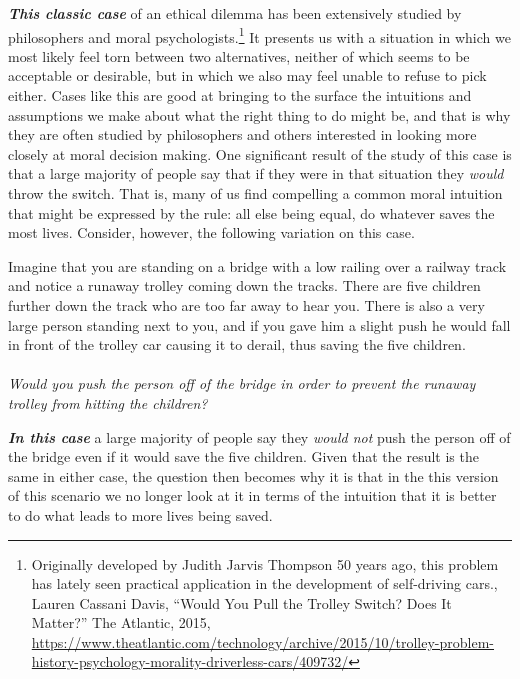 \documentclass[12pt, openany]{book}
\makeatletter
\newenvironment{kframe}{%
\medskip{}
\setlength{\fboxsep}{.8em}
 \def\at@end@of@kframe{}%
 \ifinner\ifhmode%
  \def\at@end@of@kframe{\end{minipage}}%
  \begin{minipage}{\columnwidth}%
 \fi\fi%
 \def\FrameCommand##1{\hskip\@totalleftmargin \hskip-\fboxsep
 \colorbox{shadecolor}{##1}\hskip-\fboxsep
     \hskip-\linewidth \hskip-\@totalleftmargin \hskip\columnwidth}%
 \MakeFramed {\advance\hsize-\width
   \@totalleftmargin\z@ \linewidth\hsize
   \@setminipage}}%
 {\par\unskip\endMakeFramed%
 \at@end@of@kframe}
\newenvironment{rmdblock}[1]
  {
  \begin{itemize}
  \renewcommand{\labelitemi}{
    \raisebox{-.7\height}[0pt][0pt]{
      {\setkeys{Gin}{width=3em,keepaspectratio}\texttt{[image: img/\#1]}}
    }
  }
  \setlength{\fboxsep}{1em}
  \begin{kframe}
  \item
  }
  {
  \end{kframe}
  \end{itemize}
  }
\newenvironment{question}
  {\begin{rmdblock}{question}}
  {\end{rmdblock}}
\makeatother
\begin{document}
\textbf{\emph{This classic case}} of an ethical dilemma has been extensively studied by philosophers and moral psychologists.\footnote{Originally developed by Judith Jarvis Thompson 50 years ago, this problem has lately seen practical application in the development of self-driving cars., Lauren Cassani Davis, ``Would You Pull the Trolley Switch? Does It Matter?'' The Atlantic, 2015, \url{https://www.theatlantic.com/technology/archive/2015/10/trolley-problem-history-psychology-morality-driverless-cars/409732/}} It presents us with a situation in which we most likely feel torn between two alternatives, neither of which seems to be acceptable or desirable, but in which we also may feel unable to refuse to pick either. Cases like this are good at bringing to the surface the intuitions and assumptions we make about what the right thing to do might be, and that is why they are often studied by philosophers and others interested in looking more closely at moral decision making. One significant result of the study of this case is that a large majority of people say that if they were in that situation they \emph{would} throw the switch. That is, many of us find compelling a common moral intuition that might be expressed by the rule: all else being equal, do whatever saves the most lives. Consider, however, the following variation on this case.

\begin{question}

Imagine that you are standing on a bridge with a low railing over a railway track and notice a runaway trolley coming down the tracks. There are five children further down the track who are too far away to hear you. There is also a very large person standing next to you, and if you gave him a slight push he would fall in front of the trolley car causing it to derail, thus saving the five children.\\
~\\
\emph{Would you push the person off of the bridge in order to prevent the runaway trolley from hitting the children?}

\end{question}

\textbf{\emph{In this case}} a large majority of people say they \emph{would not} push the person off of the bridge even if it would save the five children. Given that the result is the same in either case, the question then becomes why it is that in the this version of this scenario we no longer look at it in terms of the intuition that it is better to do what leads to more lives being saved.
\end{document}
